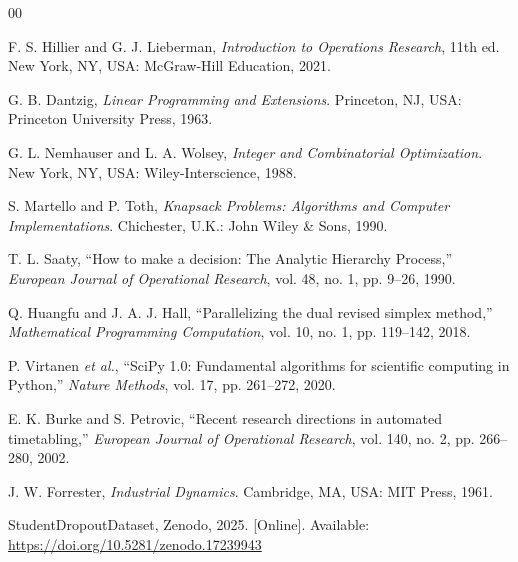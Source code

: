 \documentclass[conference]{IEEEtran}
\begin{document}
\begin{thebibliography}{00}

F. S. Hillier and G. J. Lieberman, \emph{Introduction to Operations Research}, 11th ed.
New York, NY, USA: McGraw-Hill Education, 2021.

G. B. Dantzig, \emph{Linear Programming and Extensions}. Princeton, NJ, USA: Princeton
University Press, 1963.

G. L. Nemhauser and L. A. Wolsey, \emph{Integer and Combinatorial Optimization}.
New York, NY, USA: Wiley-Interscience, 1988.

S. Martello and P. Toth, \emph{Knapsack Problems: Algorithms and Computer
Implementations}. Chichester, U.K.: John Wiley \& Sons, 1990.

T. L. Saaty, ``How to make a decision: The Analytic Hierarchy Process,''
\emph{European Journal of Operational Research}, vol. 48, no. 1, pp. 9--26, 1990.

Q. Huangfu and J. A. J. Hall, ``Parallelizing the dual revised simplex method,''
\emph{Mathematical Programming Computation}, vol. 10, no. 1, pp. 119--142, 2018.

P. Virtanen \emph{et al.}, ``SciPy 1.0: Fundamental algorithms for scientific computing
in Python,'' \emph{Nature Methods}, vol. 17, pp. 261--272, 2020.

E. K. Burke and S. Petrovic, ``Recent research directions in automated timetabling,''
\emph{European Journal of Operational Research}, vol. 140, no. 2, pp. 266--280, 2002.

J. W. Forrester, \emph{Industrial Dynamics}. Cambridge, MA, USA: MIT Press, 1961.

StudentDropoutDataset, Zenodo, 2025. [Online]. Available:
\url{https://doi.org/10.5281/zenodo.17239943}

\end{thebibliography}
\end{document}
